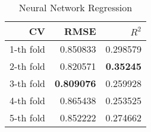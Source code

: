 \begin{table}
  \caption{Neural Network Regression}
  \begin{tabular}{rrr}
    \hline\hline
    \textbf{CV} & \textbf{RMSE} & \textbf{$R^2$} \\\hline
    1-th fold & 0.850833 & 0.298579 \\
    2-th fold & 0.820571 & \textbf{0.35245} \\
    3-th fold & \textbf{0.809076} & 0.259928 \\
    4-th fold & 0.865438 & 0.253525 \\
    5-th fold & 0.852222 & 0.274662 \\\hline\hline
  \end{tabular}
\end{table}
